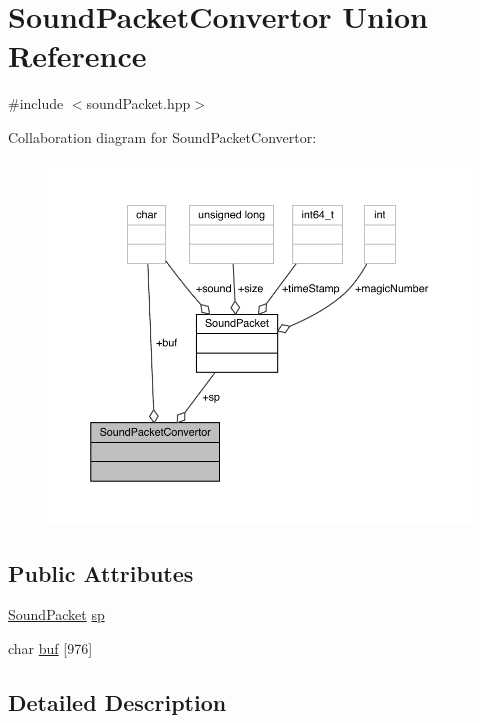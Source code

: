 \hypertarget{union_sound_packet_convertor}{}\section{Sound\+Packet\+Convertor Union Reference}
\label{union_sound_packet_convertor}


{\ttfamily \#include $<$sound\+Packet.\+hpp$>$}



Collaboration diagram for Sound\+Packet\+Convertor\+:\nopagebreak
\begin{figure}[H]
\begin{center}
\leavevmode
\includegraphics[width=350pt]{union_sound_packet_convertor__coll__graph}
\end{center}
\end{figure}
\subsection*{Public Attributes}
\begin{DoxyCompactItemize}
\item 
\mbox{\hyperlink{struct_sound_packet}{Sound\+Packet}} \mbox{\hyperlink{union_sound_packet_convertor_ab2b19fa80fbc7219bcd7e6d4818d0525}{sp}}
\item 
char \mbox{\hyperlink{union_sound_packet_convertor_a7d79a8e116c1a519b05e57f88890bba6}{buf}} \mbox{[}976\mbox{]}
\end{DoxyCompactItemize}


\subsection{Detailed Description}


